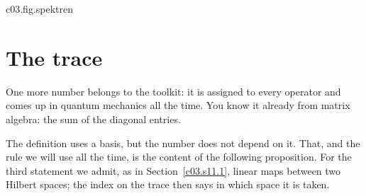 \begin{tpcfigure}{c03.fig.spektren}
  \caption{Operator classes recognised by their eigenvalues; the still has two parts. (a) Where in the complex plane the
    eigenvalues of a class may lie (Equation~\eqref{c03.eq.orte}): Hermitian on the real axis
    (solid line), positive on the half-axis $\lambda \geq 0$ (broad strip), projector in the two
    points $0$ and $1$ (filled dots), unitary on the unit circle (dashed). Normality alone admits
    every complex number. The nesting projector, positive, Hermitian is visible: two points on a
    half-axis on a line. (b) The eigenvalues of the operators of Example~\ref{c03.ex.drei}
    (Equation~\eqref{c03.eq.spektren}): $\op{A}$ (filled discs) at $0$ and $\pm\sqrt{2}$,
    $\op{B}$ (rings) at $0$ and $1$, $\op{C}$ (diamonds) at three points on the unit circle that
    divide it into three equal arcs. The eigenvalue $-\sqrt{2}$ of $\op{A}$ lies to the left of
    zero: $\op{A}$ is Hermitian but not positive. The interactive version shows loci and eigenvalues
    in one plane, for $\op{A} + s\Id$, $s\op{B}$, $r\op{C}$ and two operators on $\mathbb{C}^2$,
    with a parameter to move and the computed class tests beside it.}
\end{tpcfigure}

\section{The trace}\label{c03.s13}

One more number belongs to the toolkit: it is assigned to every operator and comes up in
quantum mechanics all the time. You know it already from matrix algebra: the sum of the diagonal
entries.


The definition uses a basis, but the number does not depend on it. That, and the rule we will use
all the time, is the content of the following proposition. For the third statement we admit, as in
Section~\ref{c03.s11.1}, linear maps between two Hilbert spaces; the index on the trace then says
in which space it is taken.

